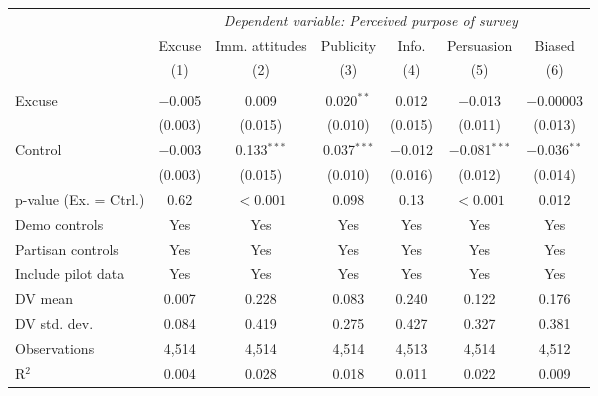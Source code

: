 
\begin{table}[!htbp] \centering 
  \label{t:2-purpose} 
\begin{threeparttable}
\begin{tabular}{@{\hspace{5pt}}l@{\hspace{5pt}}cccccc} 
\toprule 
 & \multicolumn{6}{c}{\textit{Dependent variable: Perceived purpose of survey}} \\ 
\cmidrule(rr){2-7} 
 & Excuse & Imm. attitudes & Publicity & Info. & Persuasion & Biased \\ 
 & (1) & (2) & (3) & (4) & (5) & (6)\\ 
\midrule  
\\[-2.1ex] Excuse & $-$0.005 & 0.009 & 0.020$^{**}$ & 0.012 & $-$0.013 & $-$0.00003 \\ 
  & (0.003) & (0.015) & (0.010) & (0.015) & (0.011) & (0.013) \\ 
 \addlinespace 
 Control & $-$0.003 & 0.133$^{***}$ & 0.037$^{***}$ & $-$0.012 & $-$0.081$^{***}$ & $-$0.036$^{**}$ \\ 
  & (0.003) & (0.015) & (0.010) & (0.016) & (0.012) & (0.014) \\ 
 \addlinespace 
p-value (Ex. = Ctrl.) & 0.62 & $<0.001$ & 0.098 & 0.13 & $<0.001$ & 0.012 \\ 
\midrule  
Demo controls & Yes & Yes & Yes & Yes & Yes & Yes \\ 
Partisan controls & Yes & Yes & Yes & Yes & Yes & Yes \\ 
\midrule
Include pilot data & Yes & Yes & Yes & Yes & Yes & Yes \\
\addlinespace
DV mean & 0.007 & 0.228 & 0.083 & 0.240 & 0.122 & 0.176 \\
DV std. dev. & 0.084 & 0.419 & 0.275 & 0.427 & 0.327 & 0.381 \\
Observations & 4,514 & 4,514 & 4,514 & 4,513 & 4,514 & 4,512 \\ 
R$^{2}$ & 0.004 & 0.028 & 0.018 & 0.011 & 0.022 & 0.009 \\ 
\bottomrule 
\end{tabular} 
\end{threeparttable}
\end{table} 
